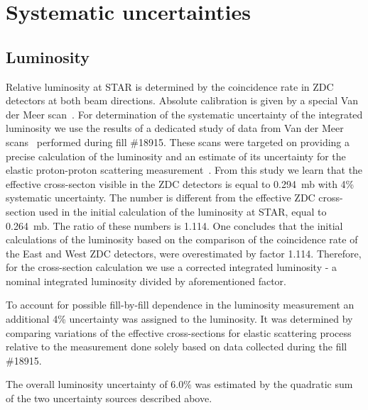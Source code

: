 

\chapter{Systematic uncertainties}\label{chap:systematicErrors} 

\section{Luminosity}\label{sec:lumiSyst}
Relative luminosity at STAR is determined by the coincidence rate in ZDC detectors at both beam directions. Absolute calibration is given by a special Van der Meer scan~\cite{vanderMeer}. For determination of the systematic uncertainty of the integrated luminosity we use the results of a dedicated study of data from Van der Meer scans~\cite{lumiNote} performed during fill \#18915. These scans were targeted on providing a precise calculation of the luminosity and an estimate of its uncertainty for the elastic proton-proton scattering measurement~\cite{elasticNote}. From this study we learn that the effective cross-secton visible in the ZDC detectors is equal to 0.294~mb with 4\% systematic uncertainty. The number is different from the effective ZDC cross-section used in the initial calculation of the luminosity at STAR, equal to 0.264~mb. The ratio of these numbers is 1.114. One concludes that the initial calculations of the luminosity based on the comparison of the coincidence rate of the East and West ZDC detectors, were overestimated by factor 1.114. Therefore, for the cross-section calculation we use a corrected integrated luminosity - a nominal integrated luminosity divided by aforementioned factor.

\indent
To account for possible fill-by-fill dependence in the luminosity measurement an additional 4\% uncertainty was assigned to the luminosity. It was determined by comparing variations of the effective cross-sections for elastic scattering process relative to the measurement done solely based on data collected during the fill \#18915.

\indent
The overall luminosity uncertainty of 6.0\% was estimated by the quadratic sum of the two uncertainty sources described above.

